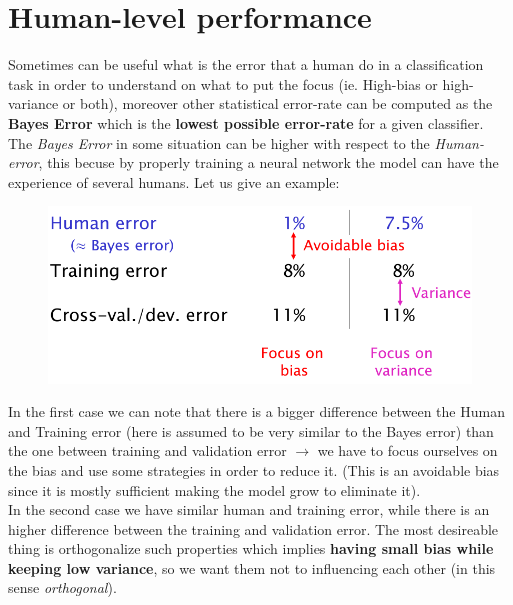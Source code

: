 \section{Human-level performance}
Sometimes can be useful what is the error that a human do in a classification task in order to understand on what to put the focus (ie. High-bias or high-variance or both), moreover other statistical error-rate can be computed as the \textbf{Bayes Error} which is the \textbf{lowest possible error-rate} for a given classifier. The \textit{Bayes Error} in some situation can be higher with respect to the \textit{Human-error}, this becuse by properly training a neural network the model can have the experience of several humans. Let us give an example:

\begin{figure}[h]
    \centering
    \includegraphics[scale=0.7]{img/performances.png}
\end{figure}
In the first case we can note that there is a bigger difference between the Human and Training error (here is assumed to be very similar to the Bayes error) than the one between training and validation error $\to$ we have to focus ourselves on the bias and use some strategies in order to reduce it. (This is an avoidable bias since it is mostly sufficient making the model grow to eliminate it).\\
In the second case we have similar human and training error, while there is an higher difference between the training and validation error. The most desireable thing is orthogonalize such properties which implies \textbf{having small bias while keeping low variance}, so we want them not to influencing each other (in this  sense \textit{orthogonal}).

